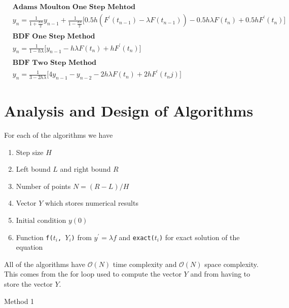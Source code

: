 \documentclass[12pt]{article}
\theoremstyle{remark}
\begin{document}
\newpage
 
\begin{align*}
	 & \textbf{Adams Moulton One Step Mehtod} \\
	 & y_n = \frac{1}{1 + \frac{h\lambda}{2}}y_{n-1} +  \frac{1}{1 - \frac{h\lambda}{2}}\bigg[0.5h(F^\prime(t_{n-1}) - \lambda F(t_{n-1})) - 0.5h\lambda F(t_n) + 0.5hF^\prime(t_n)\bigg] \\ \\
	 & \textbf{BDF One Step Method} \\
	 & y_n = \frac{1}{1 - h\lambda}\bigg[y_{n-1} - h\lambda F(t_n) + hF^\prime(t_n)\bigg] \\ \\
	 & \textbf{BDF Two Step Method} \\
	 & y_n = \frac{1}{3 - 2h\lambda} \bigg[4y_{n-1} - y_{n-2} - 2h\lambda F(t_n) + 2hF^\prime(t_nj)\bigg]
\end{align*}

\section{Analysis and Design of Algorithms}

For each of the algorithms we have 
\begin{enumerate}
	\item Step size $H$
	\item Left bound $L$ and right bound $R$
	\item Number of points $N = (R - L) / H$
	\item Vector $Y$ which stores numerical results
	\item Initial condition $y(0)$
	\item Function \texttt{f($t_i$, $Y_i$)} from $y^\prime = \lambda f$ and \texttt{exact($t_i$)} for exact solution of the equation
\end{enumerate}

All of the algorithms have $\mathcal{O}(N)$ time complexity and $\mathcal{O}(N)$ space complexity. This comes from the for loop used to compute the vector $Y$ and from having to store the vector $Y$. 

\begin{algorithm}[H]
	\caption{Method 1}
	\begin{algorithmic}[1]
		\EndFor \\
	\end{algorithmic}
\end{algorithm}
\end{document}
